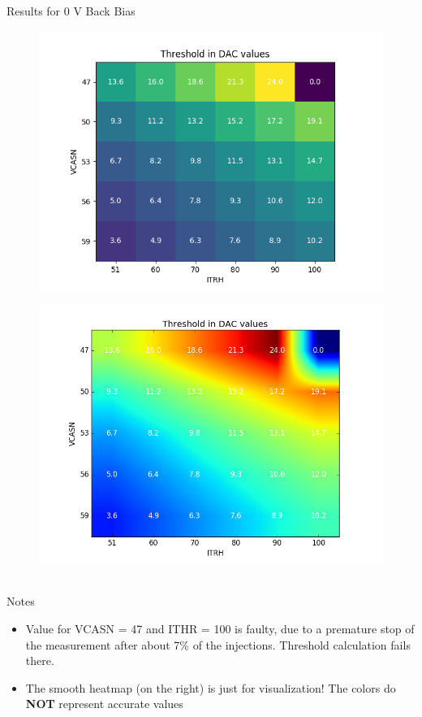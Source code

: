 \begin{frame}{Results for 0 V Back Bias}
    \begin{minipage}{.49\textwidth}
    \begin{figure}[H]
	\centering
	\includegraphics[width=\textwidth]{bb0_Heatmap.png}
    \end{figure}
    \end{minipage}
    \begin{minipage}{.49\textwidth}
    \begin{figure}[H]
	\centering
	\includegraphics[width=\textwidth]{bb0_Heatmap_soft.png}
    \end{figure}
    \end{minipage}\\[.5cm]
    \tiny
    Notes
    \begin{itemize}
    \item Value for VCASN = 47 and ITHR = 100 is faulty, due to a premature
    stop of the measurement after about 7\% of the injections.
    Threshold calculation fails there.
    \item The smooth heatmap (on the right) is just for visualization! The colors
	do \textbf{NOT} represent accurate values
    \end{itemize}
\end{frame}

